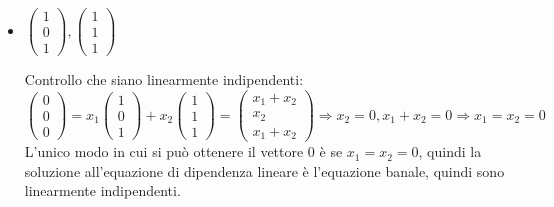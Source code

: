 \documentclass[a4paper,12pt]{article}
\begin{document}
	\begin{itemize}
		\item $\begin{pmatrix}
			1 \\ 0 \\ 1
		\end{pmatrix}, \begin{pmatrix}
		1 \\ 1 \\ 1
		\end{pmatrix}$
		
		Controllo che siano linearmente indipendenti:
		\[\begin{pmatrix} 0 \\ 0\\ 0\end{pmatrix} = 
		x_1\begin{pmatrix} 1 \\ 0 \\ 1 \end{pmatrix} + 
		x_2\begin{pmatrix} 1 \\ 1 \\ 1 \end{pmatrix} =
		\begin{pmatrix} x_1 + x_2 \\ x_2 \\ x_1 + x_2 \end{pmatrix} \Rightarrow x_2 = 0, x_1 + x_2 = 0 \Rightarrow x_1 = x_2 = 0
		\]
		L'unico modo in cui si può ottenere il vettore 0 è se $x_1 = x_2 = 0$, quindi la soluzione all'equazione di dipendenza lineare è l'equazione banale, quindi sono linearmente indipendenti.
		

\end{itemize}
\end{document}
